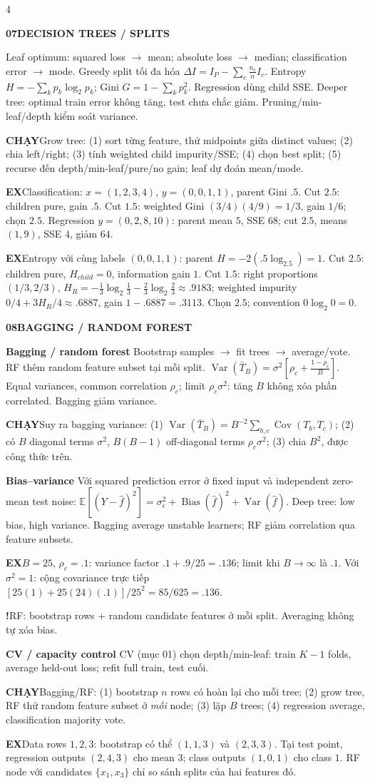 \documentclass[a4paper]{article}
\newcommand{\topic}[2]{\par\addvspace{.8pt}%
  \begingroup\setlength{\fboxsep}{0.5pt}%
  \noindent\colorbox{structure}{\parbox{\dimexpr\linewidth-2\fboxsep\relax}{%
    \color{white}\fontsize{6.5}{7.1}\selectfont\bfseries #1\enspace #2}}%
  \endgroup\par\nobreak\vspace{.3pt}\nobreak}
\newcommand{\run}[1]{\key{CHẠY}#1}
\newcommand{\key}[1]{\par\textcolor{structure}{\textbf{#1}}\enspace}
\newcommand{\note}[4]{\par\begingroup\setlength{\fboxsep}{0.15pt}%
  \noindent\colorbox{#1}{\parbox{\dimexpr\linewidth-2\fboxsep\relax}{%
    \RaggedRight\textcolor{#2}{\textbf{#3}}\enspace #4}}%
  \endgroup\par}
\newcommand{\trap}[1]{\note{warningbg}{warning}{!}{#1}}
\newcommand{\ex}[1]{\note{examplebg}{example}{EX}{#1}}
\newcommand{\E}{\mathbb{E}}
\newcommand{\Var}{\operatorname{Var}}
\begin{document}
\begin{multicols*}{4}
\topic{07}{DECISION TREES / SPLITS}
Leaf optimum: squared loss $\to$ mean; absolute loss $\to$ median; classification error $\to$ mode. Greedy split tối đa hóa
$\Delta I=I_P-\sum_c\frac{n_c}{n}I_c.$
Entropy $H=-\sum_kp_k\log_2p_k$; Gini $G=1-\sum_kp_k^2$. Regression dùng child SSE. Deeper tree: optimal train error không tăng, test chưa chắc giảm. Pruning/min-leaf/depth kiểm soát variance.
\run{Grow tree: (1) sort từng feature, thử midpoints giữa distinct values; (2) chia left/right; (3) tính weighted child impurity/SSE; (4) chọn best split; (5) recurse đến depth/min-leaf/pure/no gain; leaf dự đoán mean/mode.}
\ex{Classification: $x=(1,2,3,4)$, $y=(0,0,1,1)$, parent Gini $.5$. Cut $2.5$: children pure, gain $.5$. Cut $1.5$: weighted Gini $(3/4)(4/9)=1/3$, gain $1/6$; chọn $2.5$. Regression $y=(0,2,8,10)$: parent mean $5$, SSE $68$; cut $2.5$, means $(1,9)$, SSE $4$, giảm $64$.}
\ex{Entropy với cùng labels $(0,0,1,1)$: parent $H=-2(.5\log_2.5)=1$. Cut $2.5$: children pure, $H_{child}=0$, information gain $1$. Cut $1.5$: right proportions $(1/3,2/3)$, $H_R=-\tfrac13\log_2\tfrac13-\tfrac23\log_2\tfrac23\approx.9183$; weighted impurity $0/4+3H_R/4\approx.6887$, gain $1-.6887=.3113$. Chọn $2.5$; convention $0\log_2 0=0$.}

\topic{08}{BAGGING / RANDOM FOREST}
\key{Bagging / random forest}
Bootstrap samples $\to$ fit trees $\to$ average/vote. RF thêm random feature subset tại mỗi split.
$\Var(\bar T_B)=\sigma^2\left[\rho_c+\frac{1-\rho_c}{B}\right].$
Equal variances, common correlation $\rho_c$; limit $\rho_c\sigma^2$: tăng $B$ không xóa phần correlated. Bagging giảm variance.
\run{Suy ra bagging variance: (1) $\Var(\bar T_B)=B^{-2}\sum_{b,c}\operatorname{Cov}(T_b,T_c)$; (2) có $B$ diagonal terms $\sigma^2$, $B(B-1)$ off-diagonal terms $\rho_c\sigma^2$; (3) chia $B^2$, được công thức trên.}
\key{Bias--variance}
Với squared prediction error ở fixed input và independent zero-mean test noise:
$\E[(Y-\hat f)^2]=\sigma_\epsilon^2+\operatorname{Bias}(\hat f)^2+\Var(\hat f).$
Deep tree: low bias, high variance. Bagging average unstable learners; RF giảm correlation qua feature subsets.
\ex{$B=25$, $\rho_c=.1$: variance factor $.1+.9/25=.136$; limit khi $B\to\infty$ là $.1$. Với $\sigma^2=1$: cộng covariance trực tiếp $[25(1)+25(24)(.1)]/25^2=85/625=.136$.}
\trap{RF: bootstrap rows + random candidate features ở mỗi split. Averaging không tự xóa bias.}
\key{CV / capacity control}
CV (mục 01) chọn depth/min-leaf: train $K-1$ folds, average held-out loss; refit full train, test cuối.
\run{Bagging/RF: (1) bootstrap $n$ rows có hoàn lại cho mỗi tree; (2) grow tree, RF thử random feature subset ở \emph{mỗi} node; (3) lặp $B$ trees; (4) regression average, classification majority vote.}
\ex{Data rows $1,2,3$: bootstrap có thể $(1,1,3)$ và $(2,3,3)$. Tại test point, regression outputs $(2,4,3)$ cho mean $3$; class outputs $(1,0,1)$ cho class $1$. RF node với candidates $\{x_1,x_3\}$ chỉ so sánh splits của hai features đó.}


\end{multicols*}
\end{document}
